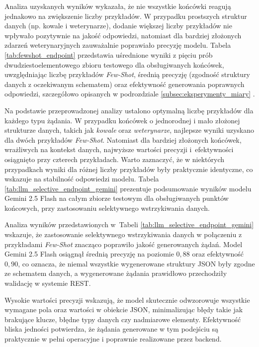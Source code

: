 Analiza uzyskanych wyników wykazała, że nie wszystkie końcówki reagują jednakowo na zwiększenie liczby przykładów. W przypadku prostszych struktur danych (np. kowale i weterynarze), dodanie większej liczby przykładów nie wpływało pozytywnie na jakość odpowiedzi, natomiast dla bardziej złożonych zdarzeń weterynaryjnych zauważalnie poprawiało precyzję modelu. Tabela \ref{tab:fewshot_endpoint} przedstawia uśrednione wyniki z pięciu prób dwudziestoelementowego zbioru testowego dla obsługiwanych końcówek, uwzględniając liczbę przykładów \textit{Few-Shot}, średnią precyzję (zgodność struktury danych z oczekiwanym schematem) oraz efektywność generowania poprawnych odpowiedzi, szczegółowo opisanych w podrozdziale \ref{subsec:eksperymenty_miary} .

Na podstawie przeprowadzonej analizy ustalono optymalną liczbę przykładów dla każdego typu żądania. W przypadku końcówek o jednorodnej i mało złożonej strukturze danych, takich jak \textit{kowale} oraz \textit{weterynarze}, najlepsze wyniki uzyskano dla dwóch przykładów \textit{Few-Shot}. Natomiast dla bardziej złożonych końcówek, wrażliwych na kontekst danych, najwyższe wartości precyzji i~efektywności osiągnięto przy czterech przykładach. Warto zaznaczyć, że w niektórych przypadkach wyniki dla różnej liczby przykładów były praktycznie identyczne, co wskazuje na stabilność odpowiedzi modelu. Tabela \ref{tab:llm_selective_endpoint_gemini} prezentuje podsumowanie wyników modelu Gemini 2.5 Flash na całym zbiorze testowym dla obsługiwanych punktów końcowych, przy zastosowaniu selektywnego wstrzykiwania danych.

Analiza wyników przedstawionych w~Tabeli \ref{tab:llm_selective_endpoint_gemini} wskazuje, że zastosowanie selektywnego wstrzykiwania danych w połączeniu z przykładami \textit{Few-Shot} znacząco poprawiło jakość generowanych żądań. Model Gemini 2.5 Flash osiągnął średnią precyzję na poziomie $0,88$ oraz efektywność $0,90$, co oznacza, że niemal wszystkie wygenerowane struktury JSON były zgodne ze schematem danych, a wygenerowane żądania prawidłowo przechodziły walidację w systemie REST.

Wysokie wartości precyzji wskazują, że model skutecznie odwzorowuje wszystkie wymagane pola oraz wartości w obiekcie JSON, minimalizując błędy takie jak brakujące klucze, błędne typy danych czy nadmiarowe elementy. Efektywność bliska jedności potwierdza, że żądania generowane w tym podejściu są praktycznie w pełni operacyjne i poprawnie realizowane przez backend.  

